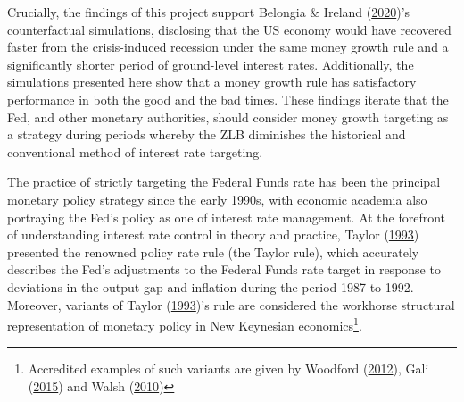 \documentclass[11pt,preprint, authoryear]{elsarticle}
\numberwithin{equation}{section}
\numberwithin{figure}{section}
\numberwithin{table}{section}
\let\rmarkdownfootnote\footnote%
\def\footnote{\protect\rmarkdownfootnote}
\begin{document}
Crucially, the findings of this project support Belongia \& Ireland
(\protect\hyperlink{ref-belongia2020}{2020})'s counterfactual
simulations, disclosing that the US economy would have recovered faster
from the crisis-induced recession under the same money growth rule and a
significantly shorter period of ground-level interest rates.
Additionally, the simulations presented here show that a money growth
rule has satisfactory performance in both the good and the bad times.
These findings iterate that the Fed, and other monetary authorities,
should consider money growth targeting as a strategy during periods
whereby the ZLB diminishes the historical and conventional method of
interest rate targeting.

The practice of strictly targeting the Federal Funds rate has been the
principal monetary policy strategy since the early 1990s, with economic
academia also portraying the Fed's policy as one of interest rate
management. At the forefront of understanding interest rate control in
theory and practice, Taylor (\protect\hyperlink{ref-taylor1993}{1993})
presented the renowned policy rate rule (the Taylor rule), which
accurately describes the Fed's adjustments to the Federal Funds rate
target in response to deviations in the output gap and inflation during
the period 1987 to 1992. Moreover, variants of Taylor
(\protect\hyperlink{ref-taylor1993}{1993})'s rule are considered the
workhorse structural representation of monetary policy in New Keynesian
economics\footnote{Accredited examples of such variants are given by
  Woodford (\protect\hyperlink{ref-woodford2012}{2012}), Gali
  (\protect\hyperlink{ref-gali2015}{2015}) and Walsh
  (\protect\hyperlink{ref-walsh2010}{2010})}.
\end{document}
